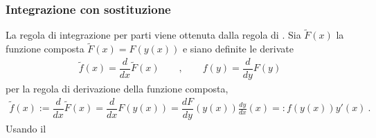 \documentclass[letterpaper,10pt,english]{jupyterBook}
\begin{document}
\subsubsection{Integrazione con sostituzione}
\label{\detokenize{ch/infinitesimal_calculus/integrals:integrazione-con-sostituzione}}\label{\detokenize{ch/infinitesimal_calculus/integrals:infinitesimal-calculus-integrals-substitution}}
\sphinxAtStartPar
La regola di integrazione per parti viene ottenuta dalla regola di {\hyperref[\detokenize{ch/infinitesimal_calculus/derivatives:equation-infinitesimal-calculus-derivatives-rules-product}]{}}. Sia \(\widetilde{F}(x)\) la funzione composta \(\widetilde{F}(x) = F( y(x) )\) e siano definite le derivate
\begin{equation*}
\begin{split}\widetilde{f}(x) = \dfrac{d}{dx} \widetilde{F}(x)  \qquad , \qquad
             f (y) = \dfrac{d}{dy}            F (y)\end{split}
\end{equation*}
\sphinxAtStartPar
per la regola di derivazione della funzione composta,
\begin{equation*}
\begin{split}\widetilde{f}(x) := \dfrac{d}{dx} \widetilde{F}(x) = \dfrac{d}{dx} F(y(x)) = 
\dfrac{d F}{d y}(y(x)) \frac{d y}{d x}(x) =: f(y(x)) y'(x) \ .\end{split}
\end{equation*}
\sphinxAtStartPar
Usando il {\hyperref[\detokenize{ch/infinitesimal_calculus/integrals:infinitesimal-calculus-integrals-thm-fund}]{}}

\sphinxAtStartPar
{}

\sphinxstepscope
\end{document}
